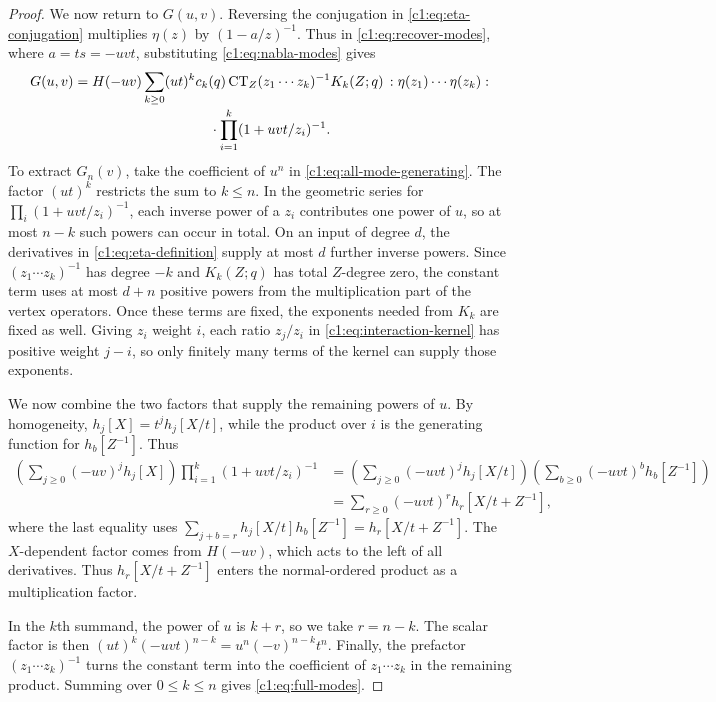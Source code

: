 \documentclass[12pt,reqno,a4paper]{amsart}
\numberwithin{equation}{section}
\numberwithin{figure}{section}
\theoremstyle{plain}
\theoremstyle{definition}
\begin{document}
\begin{proof}
We now return to $G(u,v)$.  Reversing the conjugation in
\eqref{c1:eq:eta-conjugation} multiplies $\eta(z)$ by $(1-a/z)^{-1}$.
Thus in \eqref{c1:eq:recover-modes}, where $a=ts=-uvt$, substituting
\eqref{c1:eq:nabla-modes} gives
\begin{equation}\label{c1:eq:all-mode-generating}
 \begin{aligned}
 G(u,v)
 =H(-uv)\sum_{k\geq0}(ut)^kc_k(q)
 \operatorname{CT}_Z &(z_1\cdots z_k)^{-1}K_k(Z;q)\,
 :\eta(z_1)\cdots\eta(z_k):\\[-2pt]
 &\hspace{-12mm}\cdot
       \prod_{i=1}^k(1+uvt/z_i)^{-1}.
 \end{aligned}
\end{equation}
To extract $G_n(v)$, take the coefficient of $u^n$ in
\eqref{c1:eq:all-mode-generating}.  The factor $(ut)^k$ restricts
the sum to $k\leq n$.  In the geometric series for
$\prod_i(1+uvt/z_i)^{-1}$, each inverse power of a $z_i$ contributes
one power of $u$, so at most $n-k$ such powers can occur in total.
On an input of degree $d$, the derivatives in \eqref{c1:eq:eta-definition}
supply at most $d$ further inverse powers.  Since $(z_1\cdots z_k)^{-1}$
has degree $-k$ and $K_k(Z;q)$ has total $Z$-degree zero, the constant
term uses at most $d+n$ positive powers from the multiplication part
of the vertex operators.  Once these terms are fixed, the exponents
needed from $K_k$ are fixed as well.  Giving $z_i$ weight $i$, each
ratio $z_j/z_i$ in \eqref{c1:eq:interaction-kernel} has positive weight
$j-i$, so only finitely many terms of the kernel can supply those exponents.

We now combine the two factors that supply the remaining powers of $u$.
By homogeneity, $h_j[X]=t^jh_j[X/t]$, while the product over $i$
is the generating function for $h_b[Z^{-1}]$.  Thus
\[
 \begin{aligned}
 \left(\sum_{j\geq0}(-uv)^j h_j[X]\right)\prod_{i=1}^k(1+uvt/z_i)^{-1}
 &=\left(\sum_{j\geq0}(-uvt)^j h_j[X/t]\right)
   \left(\sum_{b\geq0}(-uvt)^b h_b[Z^{-1}]\right)\\
 &=\sum_{r\geq0}(-uvt)^r h_r[X/t+Z^{-1}],
 \end{aligned}
\]
where the last equality uses
$\sum_{j+b=r}h_j[X/t]h_b[Z^{-1}]=h_r[X/t+Z^{-1}]$.
The $X$-dependent factor comes from $H(-uv)$, which acts to the left
of all derivatives.  Thus $h_r[X/t+Z^{-1}]$ enters the normal-ordered
product as a multiplication factor.

In the $k$th summand, the power of $u$ is $k+r$, so we take $r=n-k$.
The scalar factor is then
$(ut)^k(-uvt)^{n-k}=u^n(-v)^{n-k}t^n$.
Finally, the prefactor $(z_1\cdots z_k)^{-1}$ turns the constant term
into the coefficient of $z_1\cdots z_k$ in the remaining product.
Summing over $0\leq k\leq n$ gives \eqref{c1:eq:full-modes}.
\end{proof}
\end{document}
